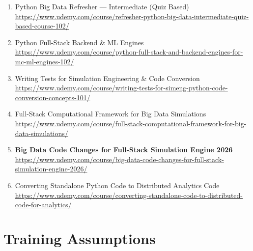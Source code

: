 \documentclass[12pt]{article}
\begin{document}
\begin{enumerate}[label=\textbf{Course \arabic*:}]
		\item Python Big Data Refresher — Intermediate (Quiz Based) \\
		\href{https://www.udemy.com/course/refresher-python-big-data-intermediate-quiz-based-course-102/}
		{https://www.udemy.com/course/refresher-python-big-data-intermediate-quiz-based-course-102/}
		
		\item Python Full-Stack Backend \& ML Engines \\
		\href{https://www.udemy.com/course/python-full-stack-and-backend-engines-for-mc-ml-engines-102/}
		{https://www.udemy.com/course/python-full-stack-and-backend-engines-for-mc-ml-engines-102/}
		
		\item Writing Tests for Simulation Engineering \& Code Conversion \\
		\href{https://www.udemy.com/course/writing-tests-for-simeng-python-code-conversion-concepts-101/}
		{https://www.udemy.com/course/writing-tests-for-simeng-python-code-conversion-concepts-101/}
		
		\item Full-Stack Computational Framework for Big Data Simulations \\
		\href{https://www.udemy.com/course/full-stack-computational-framework-for-big-data-simulations/}
		{https://www.udemy.com/course/full-stack-computational-framework-for-big-data-simulations/}
		
		\item \textbf{Big Data Code Changes for Full-Stack Simulation Engine 2026} \\
		\href{https://www.udemy.com/course/big-data-code-changes-for-full-stack-simulation-engine-2026/}
		{https://www.udemy.com/course/big-data-code-changes-for-full-stack-simulation-engine-2026/}
		
		\item Converting Standalone Python Code to Distributed Analytics Code \\
		\href{https://www.udemy.com/course/converting-standalone-code-to-distributed-code-for-analytics/}
		{https://www.udemy.com/course/converting-standalone-code-to-distributed-code-for-analytics/}
	\end{enumerate}
	
	\section*{Training Assumptions}
	
\end{document}
